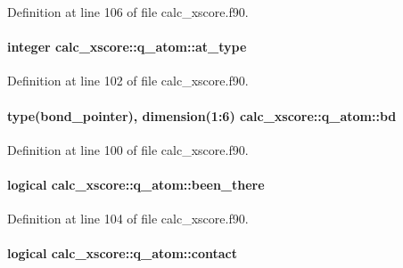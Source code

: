 Definition at line 106 of file calc\-\_\-xscore.\-f90.

\hypertarget{structcalc__xscore_1_1q__atom_a651cbb39d34397b5a4ed337abedf78ce}{
\paragraph[{at\-\_\-type}]{\setlength{\rightskip}{0pt plus 5cm}integer calc\-\_\-xscore\-::q\-\_\-atom\-::at\-\_\-type}}\label{structcalc__xscore_1_1q__atom_a651cbb39d34397b5a4ed337abedf78ce}


Definition at line 102 of file calc\-\_\-xscore.\-f90.

\hypertarget{structcalc__xscore_1_1q__atom_a0a0f16815040612804aa51b4cea79305}{
\paragraph[{bd}]{\setlength{\rightskip}{0pt plus 5cm}type({\bf bond\-\_\-pointer}), dimension(1\-:6) calc\-\_\-xscore\-::q\-\_\-atom\-::bd}}\label{structcalc__xscore_1_1q__atom_a0a0f16815040612804aa51b4cea79305}


Definition at line 100 of file calc\-\_\-xscore.\-f90.

\hypertarget{structcalc__xscore_1_1q__atom_ae52dea0a494b1da91d248bf279ded95d}{
\paragraph[{been\-\_\-there}]{\setlength{\rightskip}{0pt plus 5cm}logical calc\-\_\-xscore\-::q\-\_\-atom\-::been\-\_\-there}}\label{structcalc__xscore_1_1q__atom_ae52dea0a494b1da91d248bf279ded95d}


Definition at line 104 of file calc\-\_\-xscore.\-f90.

\hypertarget{structcalc__xscore_1_1q__atom_afb73de8506d92424ff9369cf0a36923e}{
\paragraph[{contact}]{\setlength{\rightskip}{0pt plus 5cm}logical calc\-\_\-xscore\-::q\-\_\-atom\-::contact}}\label{structcalc__xscore_1_1q__atom_afb73de8506d92424ff9369cf0a36923e}


